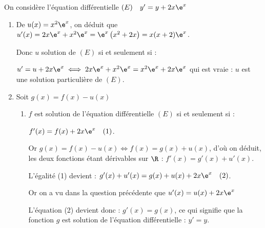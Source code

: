 
\vspace{0.5cm}

%

On considère l’équation différentielle  $(E)\quad  y'=  y+ 2 x \e^x$
 
\smallskip

\begin{enumerate}
\item %
De $u(x) = x^2\e^x$, on déduit que $u'(x) = 2x\e^x +  x^2\e^x =  \e^x\left(x^2 + 2x \right) = x(x + 2)\e^x$.

Donc $u$ solution de $(E)$ si et seulement si :

$u' = u + 2x\e^x \iff 2x\e^x +  x^2\e^x = x^2\e^x + 2 x \e^x$ qui est vraie : $u$ est 
une solution particulière de $(E)$.
\item Soit $g(x)=f(x) - u(x)$%



\smallskip

\begin{enumerate}
\item  %
$f$ est solution de l'équation différentielle $(E)$ si et seulement si :

$f'(x) = f(x) + 2x\e^x \quad (1)$.

Or $g(x) = f(x) - u(x) \iff f(x) = g(x) + u(x)$, d'où on déduit, les deux fonctions étant dérivables sur $\R$ : $f'(x) = g'(x) + u'(x)$.

L'égalité (1) devient : $g'(x) + u'(x) = g(x) + u(x) + 2x\e^x \quad (2)$.

Or on a vu dans la question précédente que $u'(x) = u(x) + 2x\e^x$

L'équation (2) devient donc : $g'(x) = g(x)$, ce qui signifie que la fonction $g$ est solution de l'équation différentielle : $y' = y$.


\end{enumerate}
\end{enumerate}
